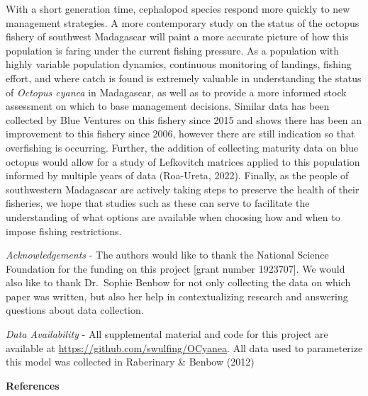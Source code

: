 \documentclass[
]{article}
\begin{document}
With a short generation time, cephalopod species respond more quickly to new management strategies. A more contemporary study on the status of the octopus fishery of southwest Madagascar will paint a more accurate picture of how this population is faring under the current fishing pressure. As a population with highly variable population dynamics, continuous monitoring of landings, fishing effort, and where catch is found is extremely valuable in understanding the status of \emph{Octopus cyanea} in Madagascar, as well as to provide a more informed stock assessment on which to base management decisions. Similar data has been collected by Blue Ventures on this fishery since 2015 and shows there has been an improvement to this fishery since 2006, however there are still indication so that overfishing is occurring. Further, the addition of collecting maturity data on blue octopus would allow for a study of Lefkovitch matrices applied to this population informed by multiple years of data (Roa-Ureta, 2022). Finally, as the people of southwestern Madagascar are actively taking steps to preserve the health of their fisheries, we hope that studies such as these can serve to facilitate the understanding of what options are available when choosing how and when to impose fishing restrictions.

\emph{Acknowledgements} - The authors would like to thank the National Science Foundation for the funding on this project {[}grant number 1923707{]}. We would also like to thank Dr.~Sophie Benbow for not only collecting the data on which paper was written, but also her help in contextualizing research and answering questions about data collection.

\emph{Data Availability} - All supplemental material and code for this project are available at \url{https://github.com/swulfing/OCyanea}. All data used to parameterize this model was collected in Raberinary \& Benbow (2012)

\newpage

\textbf{References}
\end{document}
